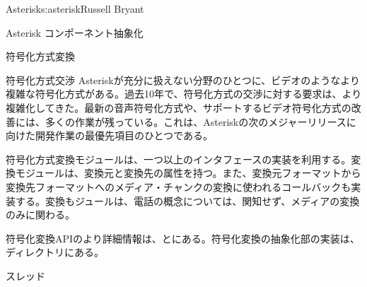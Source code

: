 \begin{aosachapter}{Asterisk}{s:asterisk}{Russell Bryant}
\begin{aosasect1}{Asterisk コンポーネント抽象化}
\begin{aosasect2}{符号化方式変換}
\begin{aosabox}{符号化方式交渉}
Asteriskが充分に扱えない分野のひとつに、ビデオのようなより複雑な符号化方式がある。過去10年で、符号化方式の交渉に対する要求は、より複雑化してきた。最新の音声符号化方式や、サポートするビデオ符号化方式の改善には、多くの作業が残っている。これは、Asteriskの次のメジャーリリースに向けた開発作業の最優先項目のひとつである。

\end{aosabox}

符号化方式変換モジュールは、一つ以上のインタフェースの実装を利用する。変換モジュールは、変換元と変換先の属性を持つ。また、変換元フォーマットから変換先フォーマットへのメディア・チャンクの変換に使われるコールバックも実装する。変換もジュールは、電話の概念については、関知せず、メディアの変換のみに関わる。

符号化変換APIのより詳細情報は、とにある。符号化変換の抽象化部の実装は、ディレクトリにある。

\end{aosasect2}

\end{aosasect1}

\begin{aosasect1}{スレッド}


\end{aosasect1}
\end{aosachapter}
